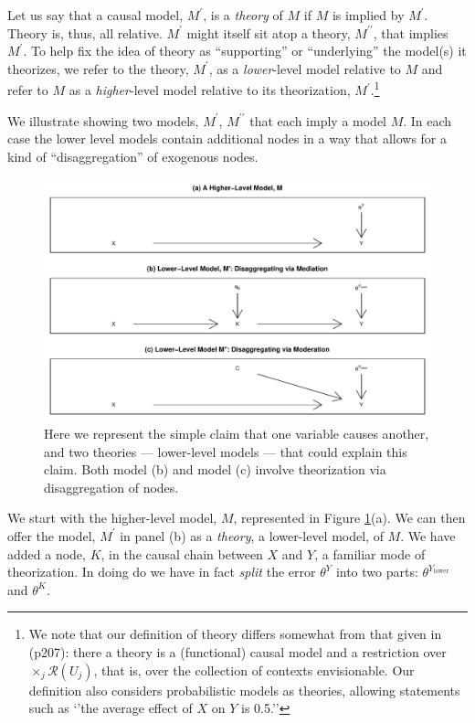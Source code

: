 \documentclass[12pt,]{book}
\let\rmarkdownfootnote\footnote%
\def\footnote{\protect\rmarkdownfootnote}
\begin{document}
Let us say that a causal model, \(M^\prime\), is a \emph{theory} of \(M\) if \(M\) is implied by \(M^\prime\). Theory is, thus, all relative. \(M^\prime\) might itself sit atop a theory, \(M^{\prime\prime}\), that implies \(M^\prime\). To help fix the idea of theory as ``supporting'' or ``underlying'' the model(s) it theorizes, we refer to the theory, \(M^\prime\), as a \emph{lower}-level model relative to \(M\) and refer to \(M\) as a \emph{higher}-level model relative to its theorization, \(M^\prime\).\footnote{We note that our definition of theory differs somewhat from that given in \citet{pearl2009causality} (p207): there a theory is a (functional) causal model and a restriction over \(\times_j \mathcal{R}(U_j)\), that is, over the collection of contexts envisionable. Our definition also considers probabilistic models as theories, allowing statements such as `'the average effect of \(X\) on \(Y\) is 0.5.''}

We illustrate showing two models, \(M^\prime\), \(M^{\prime\prime}\) that each imply a model \(M\). In each case the lower level models contain additional nodes in a way that allows for a kind of ``disaggregation'' of exogenous nodes.

\begin{figure}

{\centering \includegraphics[width=.5\textwidth]{ii_files/figure-latex/Highlow-1} 

}

\caption{Here we represent the simple claim that one variable causes another, and two theories --- lower-level models --- that could explain this claim. Both model (b) and model (c) involve theorization via disaggregation of nodes.}\label{fig:Highlow}
\end{figure}

We start with the higher-level model, \(M\), represented in Figure \ref{fig:Highlow}(a). We can then offer the model, \(M^\prime\) in panel (b) as a \emph{theory}, a lower-level model, of \(M\). We have added a node, \(K\), in the causal chain between \(X\) and \(Y\), a familiar mode of theorization. In doing do we have in fact \emph{split} the error \(\theta^Y\) into two parts: \(\theta^{Y_\text{lower}}\) and \(\theta^K\).
\end{document}
